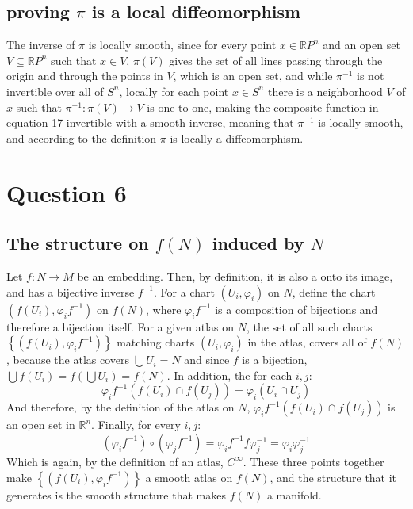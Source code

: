 \documentclass{article}
\newcommand{\R}{\ensuremath{\mathbb{R}}}
\begin{document}
\subsection*{proving $\pi$ is a local diffeomorphism}
The inverse of $\pi$ is locally smooth, since for every point $x \in \R P^n$ and an open set $V \subseteq \R P^n$ such that $x \in V$, $\pi(V)$ gives the set of all lines passing through the origin and through the points in $V$, which is an open set, and while $\pi^{-1}$ is not invertible over all of $S^n$, locally for each point $x \in S^n$ there is a neighborhood $V$ of $x$ such that $\pi^{-1} : \pi(V) \rightarrow V$ is one-to-one, making the composite function in equation 17 invertible with a smooth inverse, meaning that $\pi^{-1}$ is locally smooth, and according to the definition $\pi$ is locally a diffeomorphism.

\section*{Question 6}
\subsection*{The structure on $f(N)$ induced by $N$}
Let $f : N \rightarrow M$ be an embedding. Then, by definition, it is also a onto its image, and has a bijective inverse $f^{-1}$. For a chart $(U_i, \varphi_i)$ on $N$, define the chart $\left(f(U_i), \varphi_i f^{-1}\right)$ on $f(N)$, where $\varphi_i f^{-1}$ is a composition of bijections and therefore a bijection itself.
\newline
For a given atlas on $N$, the set of all such charts $\left\{\left(f(U_i), \varphi_i f^{-1}\right)\right\}$ matching charts $(U_i, \varphi_i)$ in the atlas, covers all of $f(N)$, because the atlas covers $\bigcup U_i = N$ and since $f$ is a bijection, $\bigcup f(U_i) = f\left(\bigcup U_i\right) = f(N)$.
\newline
In addition, the for each $i, j$:
\begin{equation}
    \varphi_i f^{-1} (f(U_i) \cap f(U_j)) = \varphi_i (U_i \cap U_j)
\end{equation}
And therefore, by the definition of the atlas on $N$, $\varphi_i f^{-1} (f(U_i) \cap f(U_j))$ is an open set in $\R^n$.
\newline
Finally, for every $i,j$:
\begin{equation}
    (\varphi_i f^{-1}) \circ (\varphi_j f^{-1}) = \varphi_i f^{-1} f \varphi_j^{-1} = \varphi_i \varphi_j^{-1}
\end{equation}
Which is again, by the definition of an atlas, $C^\infty$.
These three points together make $\left\{\left(f(U_i), \varphi_i f^{-1}\right)\right\}$ a smooth atlas on $f(N)$, and the structure that it generates is the smooth structure that makes $f(N)$ a manifold.
\end{document}
